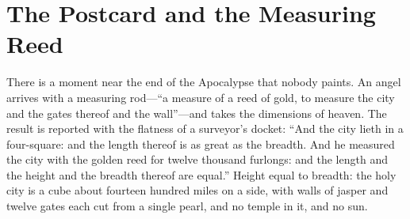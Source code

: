 \section{The Postcard and the Measuring Reed}

There is a moment near the end of the Apocalypse that nobody paints. An angel arrives with a measuring rod---``a measure of a reed of gold, to measure the city and the gates thereof and the wall''---and takes the dimensions of heaven. The result is reported with the flatness of a surveyor's docket: ``And the city lieth in a four-square: and the length thereof is as great as the breadth. And he measured the city with the golden reed for twelve thousand furlongs: and the length and the height and the breadth thereof are equal.'' Height equal to breadth: the holy city is a cube about fourteen hundred miles on a side, with walls of jasper and twelve gates each cut from a single pearl, and no temple in it, and no sun.

